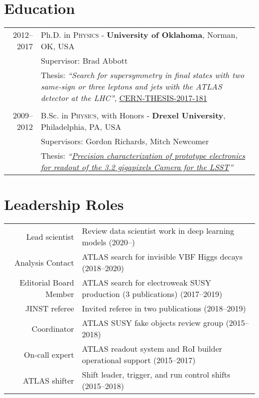 \documentclass[a4paper,10pt]{article}
\begin{document}
\vspace{3mm}
\section{Education}

\begin{tabular}{r | p{15.5cm}}
\textsc{2012--2017}			&  Ph.D. in \textsc{Physics} - \textbf{University of Oklahoma}, Norman, OK, USA \\
							& Supervisor: Brad Abbott \\ %
							& Thesis: {\it``Search for supersymmetry in final states with two same-sign or three leptons and jets with the ATLAS detector at the LHC''}, \href{https://cds.cern.ch/record/2289509/files/CERN-THESIS-2017-181.pdf}{CERN-THESIS-2017-181} \\
\multicolumn{2}{c}{} \\
\textsc{2009--2012} 	    & B.Sc. in \textsc{Physics}, with Honors - \textbf{Drexel University}, Philadelphia, PA, USA	\\
							& Supervisors: Gordon Richards, Mitch Newcomer					\\
							& Thesis: \it{``\href{https://www.nhn.ou.edu/~othrif/LSST_Camera_Electronics.pdf}{Precision characterization of prototype electronics for readout of the 3.2 gigapixels Camera for the LSST}''} \\
\end{tabular}

\vspace{3mm}
\section{Leadership Roles}
\begin{tabular}{r | p{12cm}}
\multicolumn{1}{r|}{Lead scientist}     & Review data scientist work in deep learning models  \hfill (2020--\phantom{0000}) \\
\multicolumn{1}{r|}{Analysis Contact}     & ATLAS search for invisible VBF Higgs decays  \hfill (2018--2020) \\
\multicolumn{1}{r|}{Editorial Board Member}   & ATLAS search for electroweak SUSY production (3 publications)  \hfill (2017--2019)\\
\multicolumn{1}{r|}{JINST referee}            & Invited referee in two publications \hfill (2018--2019) \\
\multicolumn{1}{r|}{Coordinator}              & ATLAS SUSY fake objects review group  \hfill (2015--2018)         \\
\multicolumn{1}{r|}{On-call expert}              & ATLAS readout system and RoI builder operational support \hfill (2015--2017)         \\
\multicolumn{1}{r|}{ATLAS shifter}           & Shift leader, trigger, and run control shifts  \hfill (2015--2018)         \\
\end{tabular}
\end{document}
